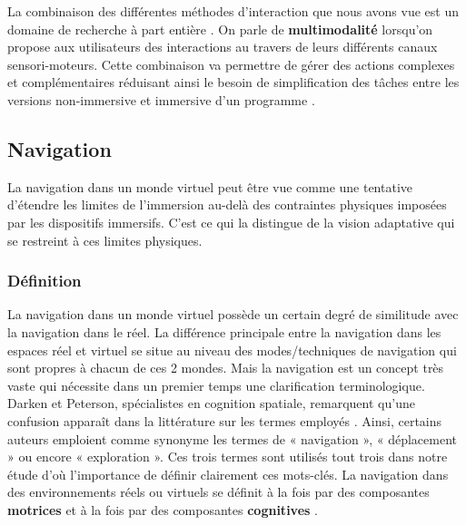 La combinaison des différentes méthodes d'interaction que nous avons vue est un domaine de recherche à part entière \cite{martin_hardware_2014,martin_reconfigurable_2011}. On parle de \textbf{multimodalité} lorsqu'on propose aux utilisateurs des interactions au travers de leurs différents canaux sensori-moteurs. Cette combinaison va permettre de gérer des actions complexes et complémentaires réduisant ainsi le besoin de simplification des tâches entre les versions non-immersive et immersive d'un programme \cite{bossard2005gestural}.



\subsection{Navigation} \label{navigation}

La navigation dans un monde virtuel peut être vue comme une tentative d'étendre les limites de l'immersion au-delà des contraintes physiques imposées par les dispositifs immersifs. C'est ce qui la distingue de la vision adaptative qui se restreint à ces limites physiques. 

\subsubsection{Définition}

La navigation dans un monde virtuel possède un certain degré de similitude avec la navigation dans le réel. La différence principale entre la navigation dans les espaces réel et virtuel se situe au niveau des modes/techniques de navigation qui sont propres à chacun de ces 2 mondes. 
Mais la navigation est un concept très vaste qui nécessite dans un premier temps une clarification terminologique. Darken et Peterson, spécialistes en cognition spatiale, remarquent qu'une confusion apparaît dans la littérature sur les termes employés \cite{darken2002spatial}. Ainsi, certains auteurs emploient comme synonyme les termes de « navigation », « déplacement » ou encore « exploration ». Ces trois termes sont utilisés tout trois dans notre étude d’où l’importance de définir clairement ces mots-clés. 
La navigation dans des environnements réels ou virtuels se définit à la fois par des composantes \textbf{motrices} et à la fois par des composantes \textbf{cognitives} \cite{bowman_doug_a_3d_2002}.

